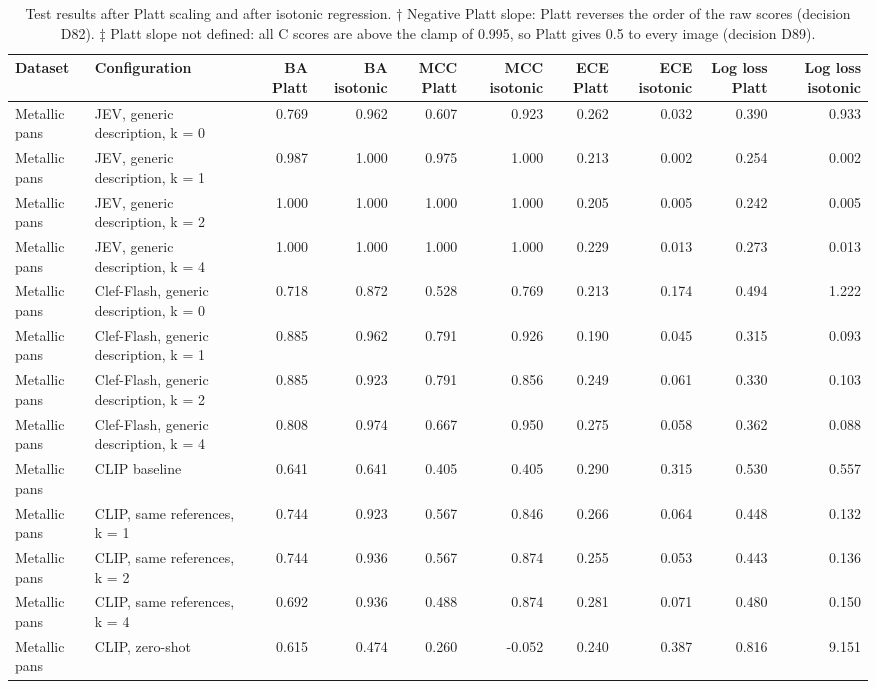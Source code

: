 \begin{table}

\caption{\label{tab:tbl-isotonic}Test results after Platt scaling and after isotonic regression. † Negative Platt slope: Platt reverses the order of the raw scores (decision D82). ‡ Platt slope not defined: all C scores are above the clamp of 0.995, so Platt gives 0.5 to every image (decision D89).}
\centering
\begin{tabular}[t]{llrrrrrrrr}
\toprule
Dataset & Configuration & BA Platt & BA isotonic & MCC Platt & MCC isotonic & ECE Platt & ECE isotonic & Log loss Platt & Log loss isotonic\\
\midrule
Metallic pans & JEV, generic description, k = 0 & 0.769 & 0.962 & 0.607 & 0.923 & 0.262 & 0.032 & 0.390 & 0.933\\
Metallic pans & JEV, generic description, k = 1 & 0.987 & 1.000 & 0.975 & 1.000 & 0.213 & 0.002 & 0.254 & 0.002\\
Metallic pans & JEV, generic description, k = 2 & 1.000 & 1.000 & 1.000 & 1.000 & 0.205 & 0.005 & 0.242 & 0.005\\
Metallic pans & JEV, generic description, k = 4 & 1.000 & 1.000 & 1.000 & 1.000 & 0.229 & 0.013 & 0.273 & 0.013\\
Metallic pans & Clef-Flash, generic description, k = 0 & 0.718 & 0.872 & 0.528 & 0.769 & 0.213 & 0.174 & 0.494 & 1.222\\
\addlinespace
Metallic pans & Clef-Flash, generic description, k = 1 & 0.885 & 0.962 & 0.791 & 0.926 & 0.190 & 0.045 & 0.315 & 0.093\\
Metallic pans & Clef-Flash, generic description, k = 2 & 0.885 & 0.923 & 0.791 & 0.856 & 0.249 & 0.061 & 0.330 & 0.103\\
Metallic pans & Clef-Flash, generic description, k = 4 & 0.808 & 0.974 & 0.667 & 0.950 & 0.275 & 0.058 & 0.362 & 0.088\\
Metallic pans & CLIP baseline & 0.641 & 0.641 & 0.405 & 0.405 & 0.290 & 0.315 & 0.530 & 0.557\\
Metallic pans & CLIP, same references, k = 1 & 0.744 & 0.923 & 0.567 & 0.846 & 0.266 & 0.064 & 0.448 & 0.132\\
\addlinespace
Metallic pans & CLIP, same references, k = 2 & 0.744 & 0.936 & 0.567 & 0.874 & 0.255 & 0.053 & 0.443 & 0.136\\
Metallic pans & CLIP, same references, k = 4 & 0.692 & 0.936 & 0.488 & 0.874 & 0.281 & 0.071 & 0.480 & 0.150\\
Metallic pans & CLIP, zero-shot & 0.615 & 0.474 & 0.260 & -0.052 & 0.240 & 0.387 & 0.816 & 9.151\\

\end{tabular}
\end{table}
